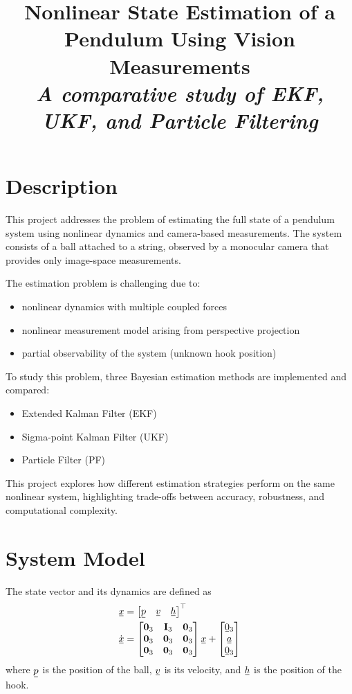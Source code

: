 \documentclass[11pt, letterpaper, twocolumn]{article}
\title{Nonlinear State Estimation of a Pendulum Using Vision Measurements \\ 
       \Large \textit{A comparative study of EKF, UKF, and Particle Filtering}}
\author{}
\date{}
\newcommand{\ul}[1] %
    {{}\mkern1mu\underline{\mkern-1mu#1\mkern-1mu}\mkern1mu}
\begin{document}
\maketitle

\section*{Description}

This project addresses the problem of estimating the full state of a pendulum system 
using nonlinear dynamics and camera-based measurements. The system consists of a ball 
attached to a string, observed by a monocular camera that provides only image-space measurements.

The estimation problem is challenging due to:
\begin{itemize}
    \item nonlinear dynamics with multiple coupled forces
    \item nonlinear measurement model arising from perspective projection
    \item partial observability of the system (unknown hook position)
\end{itemize}

To study this problem, three Bayesian estimation methods are implemented and compared:
\begin{itemize}
    \item Extended Kalman Filter (EKF)
    \item Sigma-point Kalman Filter (UKF)
    \item Particle Filter (PF)
\end{itemize}

This project explores how different estimation strategies perform on the same nonlinear system,
highlighting trade-offs between accuracy, robustness, and computational complexity.

\section*{System Model}

The state vector and its dynamics are defined as
\[\begin{aligned}
\ul{x} &= \begin{bmatrix}
    \ul{p} & \ul{v} & \ul{h}
    \end{bmatrix}^{\top} \\
\dot{\ul{x}} &= \begin{bmatrix}
    \mathbf{0}_3 & \mathbf{I}_3 & \mathbf{0}_3 \\
    \mathbf{0}_3 & \mathbf{0}_3 & \mathbf{0}_3 \\
    \mathbf{0}_3 & \mathbf{0}_3 & \mathbf{0}_3
    \end{bmatrix}\ul{x} + 
    \begin{bmatrix}
        \ul{0}_3 \\
        \ul{a} \\
        \ul{0}_3
    \end{bmatrix}
\end{aligned}
\]
where $\ul{p}$ is the position of the ball, $\ul{v}$ is its velocity, and $\ul{h}$ 
is the position of the hook.
\end{document}
